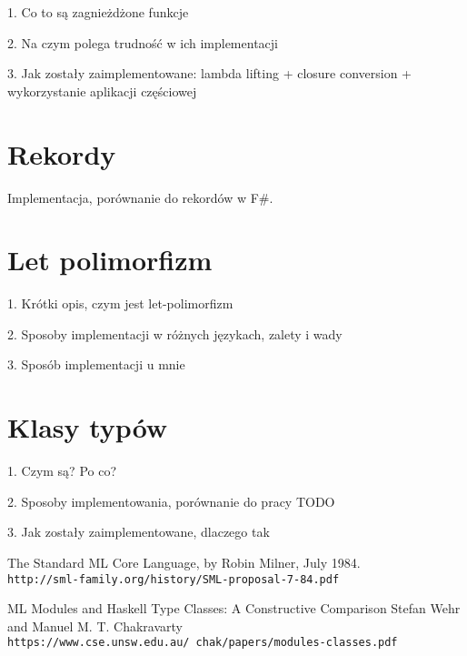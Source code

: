 \documentclass[declaration,shortabstract]{iithesis}
\begin{document}
1. Co to są zagnieżdżone funkcje 

2. Na czym polega trudność w ich implementacji 

3. Jak zostały zaimplementowane: lambda lifting + closure conversion + 
wykorzystanie aplikacji częściowej

\section{Rekordy}

Implementacja, porównanie do rekordów w F\#.

\section{Let polimorfizm}

1. Krótki opis, czym jest let-polimorfizm

2. Sposoby implementacji w różnych językach, zalety i wady 

3. Sposób implementacji u mnie

\section{Klasy typów}

1. Czym są? Po co? 

2. Sposoby implementowania, porównanie do pracy TODO

3. Jak zostały zaimplementowane, dlaczego tak


\begin{thebibliography}{1}

The Standard ML Core Language, by Robin Milner, July 1984.
\\\texttt{http://sml-family.org/history/SML-proposal-7-84.pdf}

ML Modules and Haskell Type Classes:
A Constructive Comparison
Stefan Wehr and Manuel M. T. Chakravarty
\\\texttt{https://www.cse.unsw.edu.au/~chak/papers/modules-classes.pdf}

\end{thebibliography}
\end{document}
